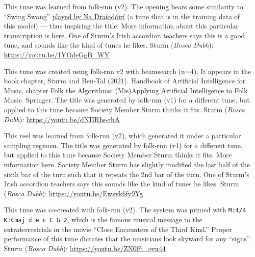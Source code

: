 \documentclass[a4paper,notitlepage,twoside]{book}
\begin{document}
\clearpage
{}
{}  
\hypertarget{reel:SwingSwangSwung}{}
This tune was learned from folk-rnn (v2).
The opening bears some similarity to ``Swing Swang'' 
\href{https://youtu.be/Fl3e4010epE?t=50}{played by Na Dra\'iod\'oir\'i}
(a tune that is in the training data of this model) ---
thus inspiring the title.
More information about this particular transcription is \href{https://highnoongmt.wordpress.com/2018/01/03/making-sense-of-the-folk-rnn-v2-model-part-5/}{here.}
One of Sturm's Irish accordion teachers says this is a good tune, and sounds like the kind of tunes he likes.
Sturm ({\em Bosca Dubh}): \url{https://youtu.be/1YOdeGgB_WY}

{}  
   
\hypertarget{reel:RoaringSillow}{}
This tune was created using folk-rnn v2 with beamsearch (n=4). It appears in the book chapter,
Sturm and Ben-Tal (2021). Handbook of Artificial Intelligence for Music, chapter Folk the Algorithms: (Mis)Applying Artificial Intelligence to Folk Music. Springer. 
The title was generated by folk-rnn (v1) for a different tune, 
but applied to this tune because Society Member Sturm thinks it fits.
Sturm ({\em Bosca Dubh}): \url{https://youtu.be/dNIIRhs-rhA}

{}  
\hypertarget{reel:MickeyFitternalys}{}
This reel was learned from folk-rnn (v2),
which generated it under a particular sampling regimen.
The title was generated by folk-rnn (v1) for a different tune, 
but applied to this tune because Society Member Sturm thinks it fits.
More information \href{https://highnoongmt.wordpress.com/2019/08/19/making-sense-of-the-folk-rnn-v2-model-part-11/}{here}.
Society Member Sturm has slightly modified the last half of the sixth bar of the turn 
such that it repeats the 2nd bar of the turn. 
One of Sturm's Irish accordion teachers says this sounds like the kind of tunes he likes.
Sturm ({\em Bosca Dubh}): \url{https://youtu.be/Ewsvk6fy9Yg}

{}  
\hypertarget{reel:CloseEncountersReel}{}
This tune was co-created with folk-rnn (v2).
The system was primed with {\tt M:4/4 K:Cmaj d e c C G 2},
which is the famous musical message to the extraterrestrials in 
the movie ``Close Encounters of the Third Kind.''
Proper performance of this tune dictates that the musicians look skyward for any ``signs''.
Sturm ({\em Bosca Dubh}): \url{https://youtu.be/ZN0Fi_oyu44}
  
\end{document}
